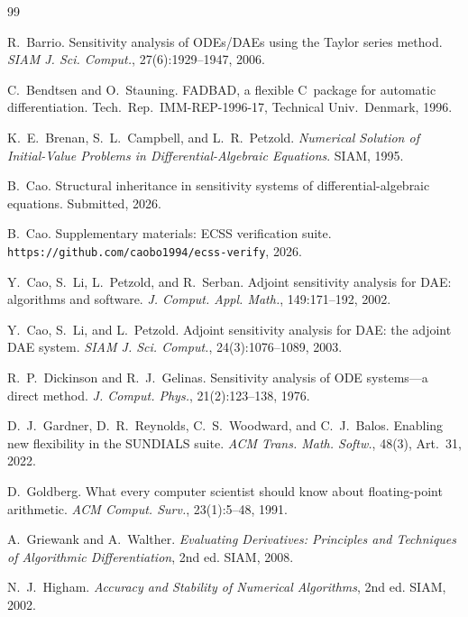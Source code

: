 \documentclass[12pt,a4paper]{article}
\theoremstyle{definition}
\theoremstyle{plain}
\theoremstyle{remark}
\newcommand{\cpp}{C\nolinebreak[4]\hspace{-.05em}\raisebox{.35ex}{\small\textbf{+\!+}}}
\begin{document}
\begin{thebibliography}{99}

R.\ Barrio.
Sensitivity analysis of ODEs/DAEs using the Taylor series method.
\textit{SIAM J. Sci. Comput.}, 27(6):1929--1947, 2006.

C.\ Bendtsen and O.\ Stauning.
FADBAD, a flexible \cpp\ package for automatic differentiation.
Tech.\ Rep.\ IMM-REP-1996-17, Technical Univ.\ Denmark, 1996.

K.\ E.\ Brenan, S.\ L.\ Campbell, and L.\ R.\ Petzold.
\textit{Numerical Solution of Initial-Value Problems in Differential-Algebraic Equations}.
SIAM, 1995.

B.\ Cao.
Structural inheritance in sensitivity systems of differential-algebraic equations.
Submitted, 2026.

B.\ Cao.
Supplementary materials: ECSS verification suite.\\
\texttt{https://github.com/caobo1994/ecss-verify}, 2026.

Y.\ Cao, S.\ Li, L.\ Petzold, and R.\ Serban.
Adjoint sensitivity analysis for DAE: algorithms and software.
\textit{J. Comput. Appl. Math.}, 149:171--192, 2002.

Y.\ Cao, S.\ Li, and L.\ Petzold.
Adjoint sensitivity analysis for DAE: the adjoint DAE system.
\textit{SIAM J. Sci. Comput.}, 24(3):1076--1089, 2003.

R.\ P.\ Dickinson and R.\ J.\ Gelinas.
Sensitivity analysis of ODE systems---a direct method.
\textit{J. Comput. Phys.}, 21(2):123--138, 1976.

D.\ J.\ Gardner, D.\ R.\ Reynolds, C.\ S.\ Woodward, and C.\ J.\ Balos.
Enabling new flexibility in the SUNDIALS suite.
\textit{ACM Trans. Math. Softw.}, 48(3), Art.\ 31, 2022.

D.\ Goldberg.
What every computer scientist should know about floating-point arithmetic.
\textit{ACM Comput. Surv.}, 23(1):5--48, 1991.

A.\ Griewank and A.\ Walther.
\textit{Evaluating Derivatives: Principles and Techniques of Algorithmic Differentiation}, 2nd ed.
SIAM, 2008.

N.\ J.\ Higham.
\textit{Accuracy and Stability of Numerical Algorithms}, 2nd ed.
SIAM, 2002.


\end{thebibliography}
\end{document}
